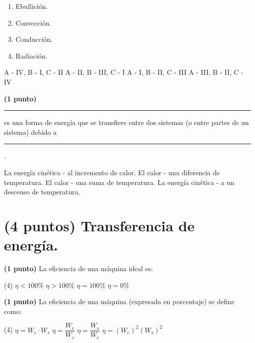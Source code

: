 \documentclass[12pt, letter]{exam}
\begin{document}
\begin{questions}
\begin{figure}[H]
    \end{figure}
    \begin{multicols}{4}
    \begin{enumerate}[label=\Roman*)]
        \item Ebullición.
        \item Convección.
        \item Conducción.
        \item Radiación.
    \end{enumerate}
    \end{multicols}
    \begin{tasks}
        \task A - IV, B - I, C - II
        \task A - II, B - III, C - I
        \task A - I, B - II, C - III
        \task A - III, B - II, C - IV
    \end{tasks}
    \question \textbf{(1 punto)} \rule{2cm}{0.1mm} es una forma de energía que se transfiere entre dos sistemas (o entre partes de un sistema) debido a \rule{2cm}{0.1mm}.
    \begin{tasks}
        \task La energía cinética - al incremento de calor.
        \task El calor - una diferencia de temperatura.
        \task El calor - una suma de temperatura.
        \task La energía cinética - a un descenso de temperatura.
    \end{tasks}

    \section{(4 puntos) Transferencia de energía.}

    \question \textbf{(1 punto)} La eficiencia de una máquina ideal es:
    \begin{tasks}(4)
        \task $\eta < 100 \%$
        \task $\eta > 100 \%$
        \task $\eta = 100 \%$
        \task $\eta = 0 \%$
    \end{tasks}
    \question \textbf{(1 punto)} La eficiencia de una máquina (expresada en porcentaje) se define como:
    \begin{tasks}(4)
        \task $\eta = W_{e} \cdot W_{s}$
        \task $\eta = \dfrac{W_{e}}{W_{s}}$
        \task $\eta = \dfrac{W_{s}}{W_{e}}$
        \task $\eta = (W_{e})^2 (W_{s})^2$
    \end{tasks}

    \newpage


\end{questions}
\end{document}

